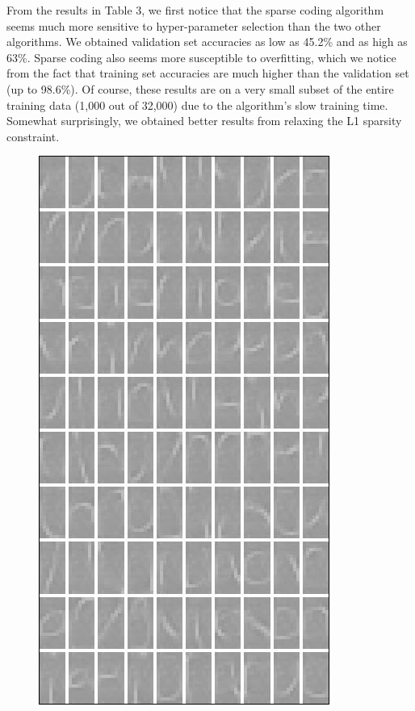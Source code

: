\documentclass{article} %
\begin{document}
From the results in Table 3, we first notice that the sparse coding algorithm seems much more sensitive to hyper-parameter selection than the two other algorithms. We obtained validation set accuracies as low as 45.2\% and as high as 63\%. Sparse coding also seems more susceptible to overfitting, which we notice from the fact that training set accuracies are much higher than the validation set (up to 98.6\%). Of course, these results are on a very small subset of the entire training data (1,000 out of 32,000) due to the algorithm's slow training time. Somewhat surprisingly, we obtained better results from relaxing the L1 sparsity constraint.
\begin{figure}
\centering
\includegraphics[scale=0.577]{figures/filters_100_clean.png}
\quad\quad\quad

\end{figure}
\end{document}
